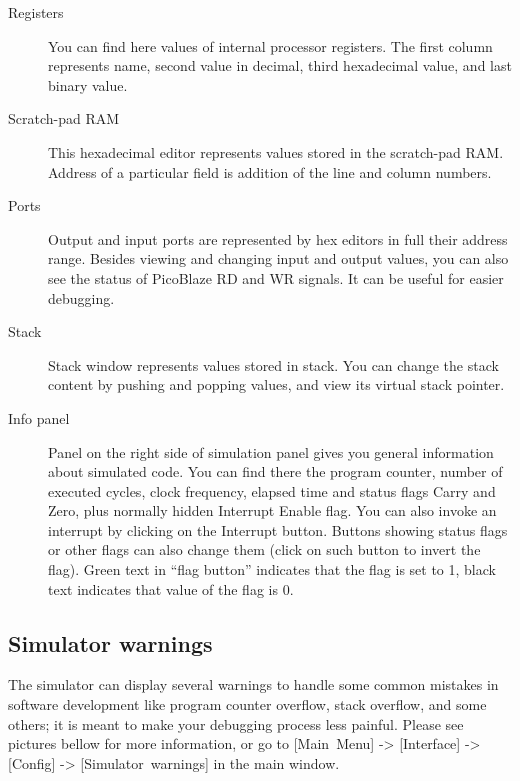     \begin{description}
        \item [Registers]
            You can find here values of internal processor registers. The first column represents name, second value in
            decimal, third hexadecimal value, and last binary value.
        \item [Scratch-pad RAM]
            This hexadecimal editor represents values stored in the scratch-pad RAM. Address of a particular field is
            addition of the line and column numbers.
        \item [Ports]
            Output and input ports are represented by hex editors in full their address range. Besides viewing and
            changing input and output values, you can also see the status of PicoBlaze RD and WR signals. It can be
            useful for easier debugging.
        \item [Stack]
            Stack window represents values stored in stack. You can change the stack content by pushing and popping
            values, and view its virtual stack pointer.
        \item [Info panel]
            Panel on the right side of simulation panel gives you general information about simulated code. You can find
            there the program counter, number of executed cycles, clock frequency, elapsed time and status flags Carry
            and Zero, plus normally hidden Interrupt Enable flag. You can also invoke an interrupt by clicking on the
            Interrupt button. Buttons showing status flags or other flags can also change them (click on such button to invert the flag). Green text in ``flag button'' indicates that the flag is set to 1, black text indicates that value of the flag is 0.
    \end{description}

    \subsection{Simulator warnings}
        The simulator can display several warnings to handle some common mistakes in software development like program counter overflow, stack overflow, and some others; it is meant to make your debugging process less painful. Please see pictures bellow for more information, or go to
        [Main~Menu] -> [Interface] -> [Config] -> [Simulator~warnings] in the main window.

